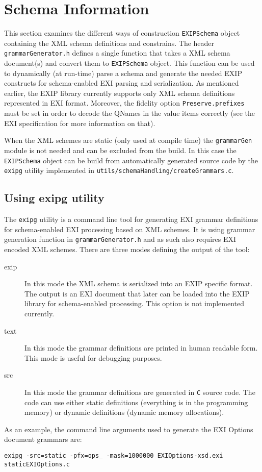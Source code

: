 \section{Schema Information}
\label{sec:Schema-Infromation}

This section examines the different ways of construction \texttt{EXIPSchema} object
containing the XML schema definitions and constrains. The header \texttt{grammarGenerator.h}
defines a single function that takes a XML schema document(s) and convert them to 
\texttt{EXIPSchema} object. This function can be used to dynamically (at run-time)
parse a schema and generate the needed EXIP constructs for schema-enabled
EXI parsing and serialization. As mentioned earlier, the EXIP library currently supports
only XML schema definitions represented in EXI format. Moreover, the fidelity option \texttt{Preserve.prefixes} must be
set in order to decode the QNames in the value items correctly (see the EXI specification for
more information on that).

When the XML schemes are static (only used at
compile time) the \texttt{grammarGen} module is not needed and can be excluded from the build.
In this case the \texttt{EXIPSchema} object can be build from automatically generated source code
by the \texttt{exipg} utility implemented in \texttt{utils/schemaHandling/createGrammars.c}.

\subsection{Using exipg utility}
The \texttt{exipg} utility is a command line tool for generating EXI grammar definitions
for schema-enabled EXI processing based on XML schemes.
It is using grammar generation
function in \texttt{grammarGenerator.h} and as such also requires EXI encoded XML schemes.
There are three modes defining the output of the tool:
\begin{description}
 \item[exip] In this mode the XML schema is serialized into an EXIP specific format. The output is
	    an EXI document that later can be loaded into the EXIP library for schema-enabled processing.
	    This option is not implemented currently.
 \item[text] In this mode the grammar definitions are printed in human readable form. This mode is
	    useful for debugging purposes.
 \item[src] In this mode the grammar definitions are generated in \texttt{C} source code. The code
	    can use either static definitions (everything is in the programming memory) or
	    dynamic definitions (dynamic memory allocations).
 \end{description}
As an example, the command line arguments used to generate the EXI Options document grammars are:
\begin{lstlisting}
exipg -src=static -pfx=ops_ -mask=1000000 EXIOptions-xsd.exi staticEXIOptions.c
\end{lstlisting}

